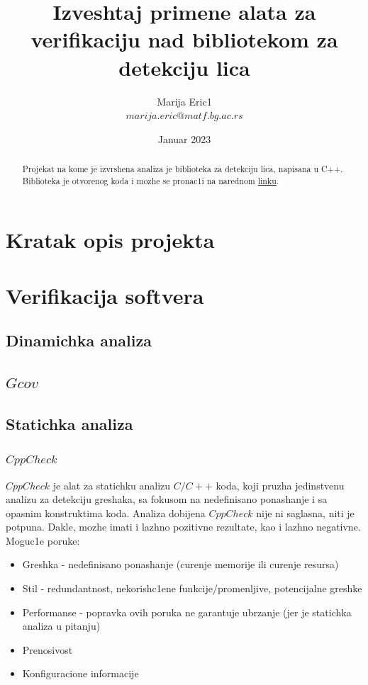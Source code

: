 \documentclass{article}
\title{Izveshtaj primene alata za verifikaciju nad bibliotekom za detekciju lica}
\author{Marija Eric1 \\ 
$marija.eric@matf.bg.ac.rs$}
\date{Januar 2023}
\begin{document}
\maketitle
\renewcommand{\abstractname}{Sazhetak}
\renewcommand*\contentsname{Sadrzhaj}



\begin{abstract}
Projekat na kome je izvrshena analiza je biblioteka za detekciju lica, napisana u C++. Biblioteka je otvorenog koda i mozhe se pronac1i na narednom \href{https://github.com/ShiqiYu/libfacedetection}{linku}. 

\end{abstract}
\tableofcontents
\newpage

\section{Kratak opis projekta}
\section{Verifikacija softvera}
\subsection{Dinamichka analiza}
\subsection{$Gcov$}
\subsection{Statichka analiza}
\subsubsection{$CppCheck$}
$CppCheck$ je alat za statichku analizu $C/C++$ koda, koji pruzha jedinstvenu analizu za detekciju greshaka, sa fokusom na nedefinisano ponashanje i sa opasnim konstruktima koda. Analiza dobijena $CppCheck$ nije ni saglasna, niti je potpuna. Dakle, mozhe imati i lazhno pozitivne rezultate, kao i lazhno negativne.
Moguc1e poruke:
\begin{itemize}
    \item Greshka - nedefinisano ponashanje (curenje memorije ili curenje resursa)
    \item Stil - redundantnost, nekorish\-c1ene funkcije/promenljive, potencijalne greshke
    \item Performanse - popravka ovih poruka ne garantuje ubrzanje (jer je statichka analiza u pitanju)
    \item Prenosivost
    \item Konfiguracione informacije
\end{itemize}
\end{document}
